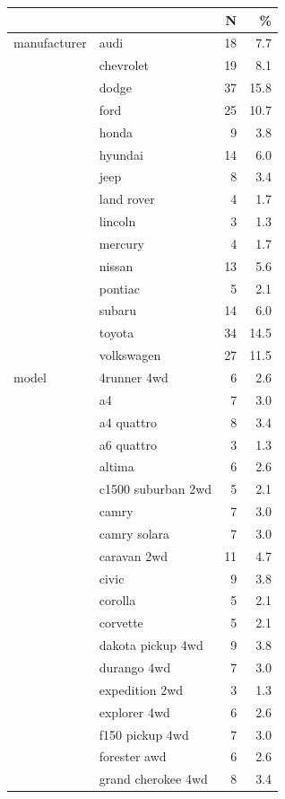 \documentclass[
  letterpaper,
  DIV=11,
  numbers=noendperiod]{scrreprt}
\begin{document}
\begin{table}
\centering
\begin{tabular}[t]{llrr}
\toprule
  &    & N & \%\\
\midrule
manufacturer & audi & 18 & \num{7.7}\\
 & chevrolet & 19 & \num{8.1}\\
 & dodge & 37 & \num{15.8}\\
 & ford & 25 & \num{10.7}\\
 & honda & 9 & \num{3.8}\\
 & hyundai & 14 & \num{6.0}\\
 & jeep & 8 & \num{3.4}\\
 & land rover & 4 & \num{1.7}\\
 & lincoln & 3 & \num{1.3}\\
 & mercury & 4 & \num{1.7}\\
 & nissan & 13 & \num{5.6}\\
 & pontiac & 5 & \num{2.1}\\
 & subaru & 14 & \num{6.0}\\
 & toyota & 34 & \num{14.5}\\
 & volkswagen & 27 & \num{11.5}\\
model & 4runner 4wd & 6 & \num{2.6}\\
 & a4 & 7 & \num{3.0}\\
 & a4 quattro & 8 & \num{3.4}\\
 & a6 quattro & 3 & \num{1.3}\\
 & altima & 6 & \num{2.6}\\
 & c1500 suburban 2wd & 5 & \num{2.1}\\
 & camry & 7 & \num{3.0}\\
 & camry solara & 7 & \num{3.0}\\
 & caravan 2wd & 11 & \num{4.7}\\
 & civic & 9 & \num{3.8}\\
 & corolla & 5 & \num{2.1}\\
 & corvette & 5 & \num{2.1}\\
 & dakota pickup 4wd & 9 & \num{3.8}\\
 & durango 4wd & 7 & \num{3.0}\\
 & expedition 2wd & 3 & \num{1.3}\\
 & explorer 4wd & 6 & \num{2.6}\\
 & f150 pickup 4wd & 7 & \num{3.0}\\
 & forester awd & 6 & \num{2.6}\\
 & grand cherokee 4wd & 8 & \num{3.4}\\

\end{tabular}
\end{table}
\end{document}
